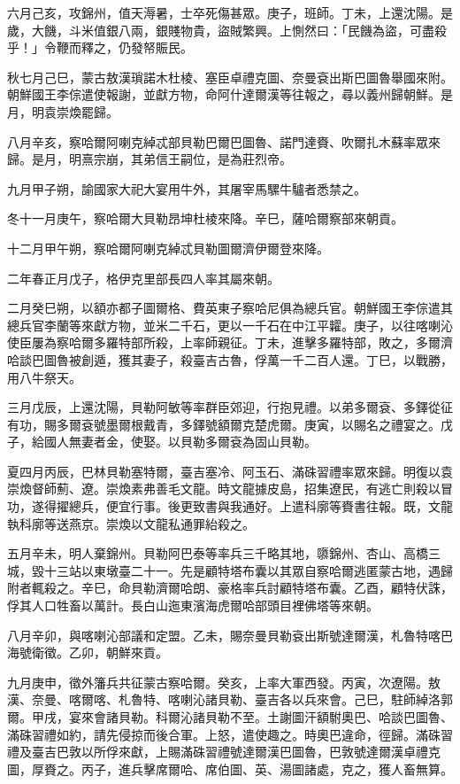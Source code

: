 \begin{pinyinscope}
六月己亥，攻錦州，值天溽暑，士卒死傷甚眾。庚子，班師。丁未，上還沈陽。是歲，大饑，斗米值銀八兩，銀賤物貴，盜賊繁興。上惻然曰：「民饑為盜，可盡殺乎！」令鞭而釋之，仍發帑賑民。

秋七月己巳，蒙古敖漢瑣諾木杜棱、塞臣卓禮克圖、奈曼袞出斯巴圖魯舉國來附。朝鮮國王李倧遣使報謝，並獻方物，命阿什達爾漢等往報之，尋以義州歸朝鮮。是月，明袁崇煥罷歸。

八月辛亥，察哈爾阿喇克綽忒部貝勒巴爾巴圖魯、諾門達賚、吹爾扎木蘇率眾來歸。是月，明熹宗崩，其弟信王嗣位，是為莊烈帝。

九月甲子朔，諭國家大祀大宴用牛外，其屠宰馬騾牛驢者悉禁之。

冬十一月庚午，察哈爾大貝勒昂坤杜棱來降。辛巳，薩哈爾察部來朝貢。

十二月甲午朔，察哈爾阿喇克綽忒貝勒圖爾濟伊爾登來降。

二年春正月戊子，格伊克里部長四人率其屬來朝。

二月癸巳朔，以額亦都子圖爾格、費英東子察哈尼俱為總兵官。朝鮮國王李倧遣其總兵官李蘭等來獻方物，並米二千石，更以一千石在中江平糶。庚子，以往喀喇沁使臣屢為察哈爾多羅特部所殺，上率師親征。丁未，進擊多羅特部，敗之，多爾濟哈談巴圖魯被創遁，獲其妻子，殺臺吉古魯，俘萬一千二百人還。丁巳，以戰勝，用八牛祭天。

三月戊辰，上還沈陽，貝勒阿敏等率群臣郊迎，行抱見禮。以弟多爾袞、多鐸從征有功，賜多爾袞號墨爾根戴青，多鐸號額爾克楚虎爾。庚寅，以賜名之禮宴之。戊子，給國人無妻者金，使娶。以貝勒多爾袞為固山貝勒。

夏四月丙辰，巴林貝勒塞特爾，臺吉塞冷、阿玉石、滿硃習禮率眾來歸。明復以袁崇煥督師薊、遼。崇煥素弗善毛文龍。時文龍據皮島，招集遼民，有逃亡則殺以冒功，遂得擢總兵，便宜行事。後更致書與我通好。上遣科廓等賚書往報。既，文龍執科廓等送燕京。崇煥以文龍私通罪紿殺之。

五月辛未，明人棄錦州。貝勒阿巴泰等率兵三千略其地，隳錦州、杏山、高橋三城，毀十三站以東墩臺二十一。先是顧特塔布囊以其眾自察哈爾逃匿蒙古地，遇歸附者輒殺之。辛巳，命貝勒濟爾哈朗、豪格率兵討顧特塔布囊。乙酉，顧特伏誅，俘其人口牲畜以萬計。長白山迤東濱海虎爾哈部頭目裡佛塔等來朝。

八月辛卯，與喀喇沁部議和定盟。乙未，賜奈曼貝勒袞出斯號達爾漢，札魯特喀巴海號衛徵。乙卯，朝鮮來貢。

九月庚申，徵外籓兵共征蒙古察哈爾。癸亥，上率大軍西發。丙寅，次遼陽。敖漢、奈曼、喀爾喀、札魯特、喀喇沁諸貝勒、臺吉各以兵來會。己巳，駐師綽洛郭爾。甲戌，宴來會諸貝勒。科爾沁諸貝勒不至。土謝圖汗額駙奧巴、哈談巴圖魯、滿硃習禮如約，請先侵掠而後合軍。上怒，遣使趣之。時奧巴違命，徑歸。滿硃習禮及臺吉巴敦以所俘來獻，上賜滿硃習禮號達爾漢巴圖魯，巴敦號達爾漢卓禮克圖，厚賚之。丙子，進兵擊席爾哈、席伯圖、英、湯圖諸處，克之，獲人畜無算。


\end{pinyinscope}
